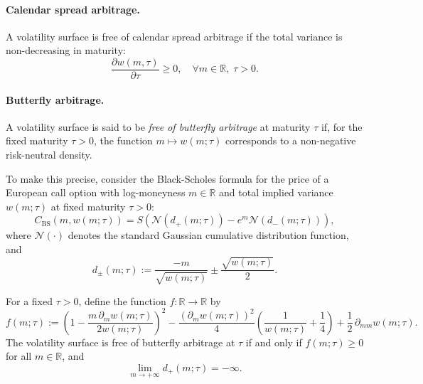\documentclass{article}
\begin{document}
\paragraph{Calendar spread arbitrage.}
A volatility surface is free of calendar spread arbitrage if the total variance is non-decreasing in maturity:
\begin{equation}
    \frac{\partial w(m, \tau)}{\partial \tau} \geq 0, 
    \quad \forall m \in \mathbb{R}, \; \tau > 0.
\end{equation}




\paragraph{Butterfly arbitrage.} \label{par:butterfly}
A volatility surface is said to be \textit{free of butterfly arbitrage} at maturity $\tau$ if, for the fixed maturity $\tau > 0$, the function $m \mapsto w(m; \tau)$ corresponds to a non-negative risk-neutral density.

To make this precise, consider the Black-Scholes formula for the price of a European call option with log-moneyness $m \in \mathbb{R}$ and total implied variance $w(m; \tau)$ at fixed maturity $\tau > 0$:
\begin{equation}
C_{\text{BS}}(m, w(m; \tau)) = S \left( \mathcal{N}(d_+(m; \tau)) - e^{m} \mathcal{N}(d_-(m; \tau)) \right),
\end{equation}
where $\mathcal{N}(\cdot)$ denotes the standard Gaussian cumulative distribution function, and
\begin{equation}
d_\pm(m; \tau) := \frac{-m}{\sqrt{w(m; \tau)}} \pm \frac{\sqrt{w(m; \tau)}}{2}.
\end{equation}

For a fixed $\tau > 0$, define the function $f : \mathbb{R} \to \mathbb{R}$ by
\begin{equation}\label{eq:butterfly}
f(m; \tau) := \left( 1 - \frac{m \, \partial_m w(m; \tau)}{2 w(m; \tau)} \right)^2
- \frac{(\partial_m w(m; \tau))^2}{4} \left( \frac{1}{w(m; \tau)} + \frac{1}{4} \right)
+ \frac{1}{2} \, \partial_{mm} w(m; \tau).
\end{equation}
The volatility surface is free of butterfly arbitrage at $\tau$ if and only if $f(m; \tau) \geq 0$ for all $m \in \mathbb{R}$, and
\begin{equation}
\lim_{m \to +\infty} d_+(m; \tau) = -\infty.
\end{equation}
\end{document}
